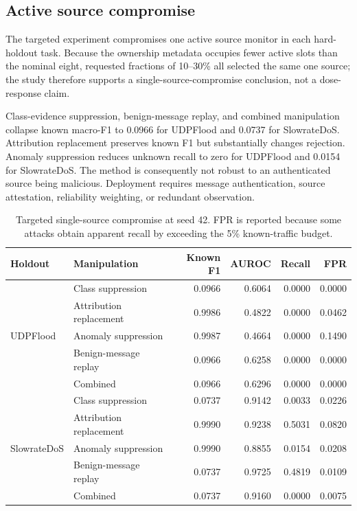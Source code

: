 \subsection{Active source compromise}

The targeted experiment compromises one active source monitor in each hard-holdout task. Because the ownership metadata occupies fewer active slots than the nominal eight, requested fractions of 10--30\% all selected the same one source; the study therefore supports a single-source-compromise conclusion, not a dose-response claim.

Class-evidence suppression, benign-message replay, and combined manipulation collapse known macro-F1 to 0.0966 for UDPFlood and 0.0737 for SlowrateDoS. Attribution replacement preserves known F1 but substantially changes rejection. Anomaly suppression reduces unknown recall to zero for UDPFlood and 0.0154 for SlowrateDoS. The method is consequently not robust to an authenticated source being malicious. Deployment requires message authentication, source attestation, reliability weighting, or redundant observation.

\begin{table}[H]
\caption{Targeted single-source compromise at seed 42. FPR is reported because some attacks obtain apparent recall by exceeding the 5\% known-traffic budget.}
\label{tab:active}
\centering
\scriptsize
\begin{tabular}{llrrrr}
\toprule
Holdout & Manipulation & Known F1 & AUROC & Recall & FPR \\
\midrule
\multirow{5}{*}{UDPFlood}
& Class suppression & 0.0966 & 0.6064 & 0.0000 & 0.0000 \\
& Attribution replacement & 0.9986 & 0.4822 & 0.0000 & 0.0462 \\
& Anomaly suppression & 0.9987 & 0.4664 & 0.0000 & 0.1490 \\
& Benign-message replay & 0.0966 & 0.6258 & 0.0000 & 0.0000 \\
& Combined & 0.0966 & 0.6296 & 0.0000 & 0.0000 \\
\midrule
\multirow{5}{*}{SlowrateDoS}
& Class suppression & 0.0737 & 0.9142 & 0.0033 & 0.0226 \\
& Attribution replacement & 0.9990 & 0.9238 & 0.5031 & 0.0820 \\
& Anomaly suppression & 0.9990 & 0.8855 & 0.0154 & 0.0208 \\
& Benign-message replay & 0.0737 & 0.9725 & 0.4819 & 0.0109 \\
& Combined & 0.0737 & 0.9160 & 0.0000 & 0.0075 \\
\bottomrule
\end{tabular}
\end{table}
